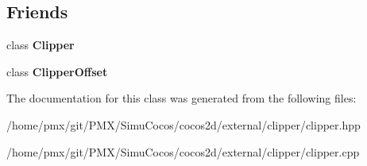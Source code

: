 \subsection*{Friends}
\begin{DoxyCompactItemize}
\item 
\mbox{\label{classClipperLib_1_1PolyNode_a45ad8a460adf59bb3701c703cc85bd11}} 
class {\bfseries Clipper}
\item 
\mbox{\label{classClipperLib_1_1PolyNode_ae6ffca5664852e614150c737780bc53b}} 
class {\bfseries Clipper\+Offset}
\end{DoxyCompactItemize}


The documentation for this class was generated from the following files\+:\begin{DoxyCompactItemize}
\item 
/home/pmx/git/\+P\+M\+X/\+Simu\+Cocos/cocos2d/external/clipper/clipper.\+hpp\item 
/home/pmx/git/\+P\+M\+X/\+Simu\+Cocos/cocos2d/external/clipper/clipper.\+cpp\end{DoxyCompactItemize}
